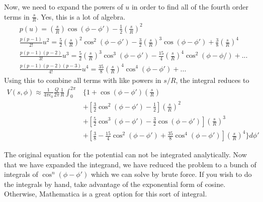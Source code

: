 \documentclass[a4paper, 11pt]{article}
\newenvironment{solution}{%
	\begin{list}{}{%
			\setlength{\topsep}{0pt}%
			\setlength{\leftmargin}{0.5cm}%
			\setlength{\rightmargin}{0.5cm}%
			\setlength{\listparindent}{\parindent}%
			\setlength{\itemindent}{\parindent}%
			\setlength{\parsep}{\parskip}%
		}%
		\item[]}{\end{list}}
\begin{document}
\begin{solution}
  \noindent Now, we need to expand the powers of $u$ in order to find all of the fourth
  order terms in $\frac{s}{R}$. Yes, this is a lot of algebra. 
  \begin{align}
    &p(u) =  \left( \frac{s}{R} \right)\cos(\phi-\phi')-\frac{1}{2}\left( \frac{s}{R} \right)^2\\
    &\frac{p(p-1)}{2!}u^2 = \frac{5}{2}\left( \frac{s}{R} \right)^2\cos^2(\phi-\phi')-\frac{3}{2}\left( \frac{s}{R} \right)^3\cos(\phi-\phi')+\frac{3}{8}\left( \frac{s}{R} \right)^4 \\
    & \frac{p(p-1)(p-2)}{3!}u^3 = \frac{5}{2}\left( \frac{s}{R} \right)^3\cos^3(\phi-\phi')-\frac{15}{4}\left( \frac{s}{R} \right)^4\cos^2(\phi-\phi/) +...\\
    & \frac{p(p-1)(p-2)(p-3)}{4!}u^4 = \frac{35}{8}\left( \frac{s}{R} \right)^4\cos^4(\phi-\phi')+...
  \end{align}
  Using this to combine all terms with like powers in $s/R$, the integral reduces to
  \begin{equation}
    \begin{split}
      V(s,\phi)\approx\frac{1}{4\pi\epsilon_0}\frac{Q}{2\pi}\frac{1}{R}\int_0^{2\pi}&\Bigg\{ 1+\cos(\phi-\phi')\left( \frac{s}{R} \right)\\
      &+ \left[ \frac{3}{2}\cos^2(\phi-\phi')-\frac{1}{2}  \right]\left( \frac{s}{R} \right)^2\\
      &+ \left[ \frac{5}{2}\cos^3(\phi-\phi')-\frac{3}{2}\cos(\phi-\phi')    \right]\left( \frac{s}{R} \right)^3\\
      &+ \left[ \frac{3}{8}-\frac{15}{4}\cos^2(\phi-\phi')+\frac{35}{8}\cos^4(\phi-\phi') \right]\left( \frac{s}{R} \right)^4  \Bigg\}d\phi'
    \end{split}
  \end{equation}

  \noindent The original equation for the potential can not be integrated analytically.
  Now that we have expanded the integrand, we have reduced the problem to a
  bunch of integrals of $\cos^n(\phi-\phi')$ which we can solve by 
  brute force. If you wish to do the integrals by hand, take advantage of the
  exponential form of cosine. Otherwise, Mathematica is a great option for this
  sort of integral. \\


  

  


\end{solution}
\end{document}
